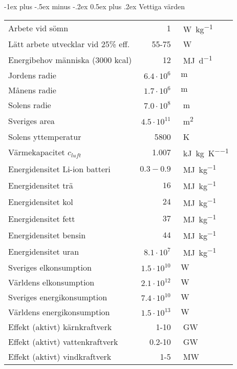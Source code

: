\documentclass[10pt,landscape]{article}
\makeatletter
\renewcommand{\section}{\@startsection{section}{1}{0mm}%
                                {-1ex plus -.5ex minus -.2ex}%
                                {0.5ex plus .2ex}%
                                {\normalfont\large\bfseries}
                                }
\makeatother
\begin{document}
\begin{multicols}{3}
\section{Vettiga värden}
\begin{tabular}{l r l}
Arbete vid sömn & 1 & \SI{}{\watt\per\kilogram}\\
Lätt arbete utvecklar vid 25\% eff. & 55-75 & \SI{}{\watt}\\
Energibehov människa (3000 kcal) & 12 & \SI{}{\mega\joule\per\day}\\
Jordens radie & $6.4 \cdot 10^{6}$ & $\SI{}{\meter}$\\
Månens radie & $1.7 \cdot 10^6$ & $\SI{}{\meter}$\\
Solens radie & $7.0 \cdot 10^8$ & \SI{}{\meter}\\
Sveriges area & $4.5 \cdot 10^{11}$ & \SI{}{\square\meter}\\
Solens yttemperatur & 5800 & \SI{}{\kelvin}\\
Värmekapacitet  $c_{luft}$ & 1.007 & \SI{}{\kilo\joule\per\kilogram\per\kelvin}\\
Energidensitet Li-ion batteri & $0.3-0.9$ & \SI{}{\mega\joule\per\kilogram}\\
Energidensitet trä & $16$ & \SI{}{\mega\joule\per\kilogram}\\
Energidensitet kol & $24$ & \SI{}{\mega\joule\per\kilogram}\\
Energidensitet fett & $37$ & \SI{}{\mega\joule\per\kilogram}\\
Energidensitet bensin & $44$ & \SI{}{\mega\joule\per\kilogram}\\
Energidensitet uran & $8.1 \cdot 10^7$ & \SI{}{\mega\joule\per\kilogram}\\
Sveriges elkonsumption & $1.5 \cdot 10^{10}$ & $\SI{}{\watt}$\\
Världens elkonsumption & $2.1 \cdot 10^{12}$ & $\SI{}{\watt}$\\
Sveriges energikonsumption & $7.4 \cdot 10^{10}$ & $\SI{}{\watt}$\\
Världens energikonsumption & $1.5 \cdot 10^{13}$ & $\SI{}{\watt}$\\
Effekt (aktivt) kärnkraftverk & 1-10 & \SI{}{\giga\watt}\\
Effekt (aktivt) vattenkraftverk & 0.2-10 & \SI{}{\giga\watt}\\
Effekt (aktivt) vindkraftverk & 1-5 & \SI{}{\mega\watt}\\
\end{tabular}


\end{multicols}
\end{document}
